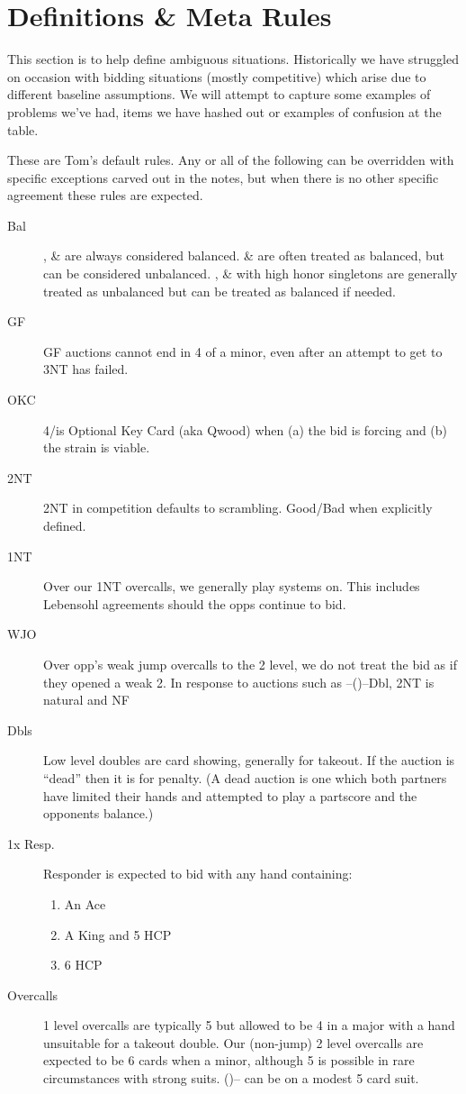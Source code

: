 \documentclass[tom-drew]{subfiles}
\begin{document}
	
	\chapter{Definitions \& Meta Rules}
	
	This section is to help define ambiguous situations. Historically we have struggled on occasion with bidding situations (mostly competitive) which arise due to different baseline assumptions.  We will attempt to capture some examples of problems we've had, items we have hashed out or examples of confusion at the table.
	
	These are Tom's default rules.  Any or all of the following can be overridden with specific exceptions carved out in the notes, but when there is no other specific agreement these rules are expected.
	
	\begin{description}
		\item[Bal] ,  \&  are always considered balanced.  \&  are often treated as balanced, but can be considered unbalanced. ,  \&  with high honor singletons are generally treated as unbalanced but can be treated as balanced if needed.
		\item[GF] GF auctions cannot end in 4 of a minor, even after an attempt to get to 3NT has failed.
		\item[OKC] 4\clubsuit/\diamondsuit is Optional Key Card (aka Qwood) when (a) the bid is forcing and (b) the strain is viable.
		\item[2NT] 2NT in competition defaults to scrambling. Good/Bad when explicitly defined.
		\item[1NT] Over our 1NT overcalls, we generally play systems on. This includes Lebensohl agreements should the opps continue to bid.
		\item[WJO] Over opp's weak jump overcalls to the 2 level, we do not treat the bid as if they opened a weak 2. In response to auctions such as --()--Dbl, 2NT is natural and NF
		\item[Dbls] Low level doubles are card showing, generally for takeout. If the auction is ``dead'' then it is for penalty. (A dead auction is one which both partners have limited their hands and attempted to play a partscore and the opponents balance.)
		\item[1x Resp.] Responder is expected to bid with any hand containing:
		\begin{enumerate}
			\item An Ace
			\item A King and 5 HCP
			\item 6 HCP
		\end{enumerate}
		\item[Overcalls] 1 level overcalls are typically 5 but allowed to be 4 in a major with a hand unsuitable for a takeout double. Our (non-jump) 2 level overcalls are expected to be 6 cards when a minor, although 5 is possible in rare circumstances with strong suits. ()-- can be on a modest 5 card suit.
	\end{description} 
	
\end{document}
